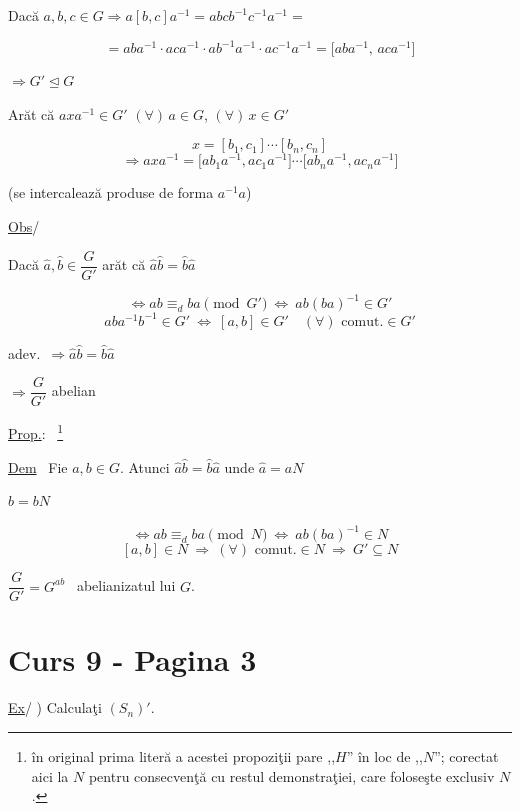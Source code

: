 \bigskip
\noindent Dacă $a,b,c\in G \Rightarrow a[b,c]a^{-1} = abcb^{-1}c^{-1}a^{-1} =$

\[
= aba^{-1}\cdot aca^{-1}\cdot ab^{-1}a^{-1}\cdot ac^{-1}a^{-1} = \big[aba^{-1},\,aca^{-1}\big]
\]

\noindent $\Rightarrow G'\trianglelefteq G$

\bigskip
\noindent Arăt că $axa^{-1}\in G'$ $(\forall)\,a\in G$, $(\forall)\,x\in G'$

\[
x=[b_1,c_1]\cdots[b_n,c_n]
\]
\[
\Rightarrow axa^{-1} = \big[ab_1a^{-1},ac_1a^{-1}\big]\cdots\big[ab_na^{-1},ac_na^{-1}\big]
\]

\noindent (se intercalează produse de forma $a^{-1}a$)

\bigskip
\noindent\underline{Obs}/ \quad {}

\bigskip
\noindent Dacă $\hat a,\hat b\in \dfrac{G}{G'}$ arăt că $\hat a\hat b=\hat b\hat a$

\[
\Leftrightarrow ab\equiv_{d} ba \pmod{G'} \ \Leftrightarrow \ ab(ba)^{-1}\in G'
\]
\[
aba^{-1}b^{-1}\in G' \ \Leftrightarrow \ [a,b]\in G' \quad (\forall)\text{ comut.}\in G'
\]

\noindent adev.\ $\Rightarrow \hat a\hat b=\hat b\hat a$

\noindent $\Rightarrow \dfrac{G}{G'}$ abelian

\bigskip
\noindent\underline{Prop.}: \ \footnote{în original prima literă a acestei propoziţii pare ,,$H$'' în loc de ,,$N$''; corectat aici la $N$ pentru consecvenţă cu restul demonstraţiei, care foloseşte exclusiv $N$.}

\bigskip
\noindent\underline{Dem} \ Fie $a,b\in G$. Atunci $\hat a\hat b=\hat b\hat a$ unde $\hat a=aN$

\noindent $\hat b=bN$

\[
\Leftrightarrow ab\equiv_{d} ba \pmod{N} \ \Leftrightarrow \ ab(ba)^{-1}\in N
\]
\[
[a,b]\in N \ \Rightarrow \ (\forall)\text{ comut.}\in N \ \Rightarrow \ G'\subseteq N
\]

\bigskip
\noindent $\dfrac{G}{G'} = G^{ab}$ \ abelianizatul lui $G$.



\section*{Curs 9 - Pagina 3}


\noindent\underline{Ex}/ ) Calculaţi $(S_n)'$.

